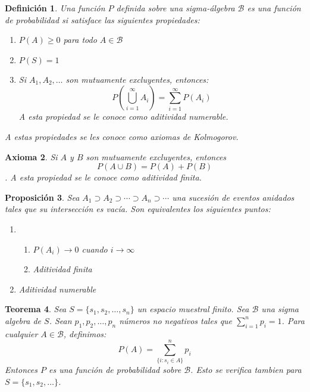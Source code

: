 \documentclass[14pt]{extarticle}
\newtheorem{theorem}{Teorema}[section]
\newtheorem{proposition}[theorem]{Proposición}
\newtheorem{definition}[theorem]{Definición}
\newtheorem{axiom}[theorem]{Axioma}
\begin{document}
\begin{definition}
    Una función $P$ definida sobre una sigma-álgebra $\mathcal{B}$ es una función de probabilidad si satisface las siguientes propiedades:
    \begin{enumerate}
        \item $P(A) \geq 0$ para todo $A \in \mathcal{B}$
        \item $P(S) = 1$
        \item Si $A_1, A_2, \ldots$ son mutuamente excluyentes, entonces:
        \[
            P(\bigcup_{i=1}^\infty A_i) = \sum_{i=1}^\infty P(A_i)
        \] 
        A esta propiedad se le conoce como aditividad numerable.
    \end{enumerate}
    A estas propiedades se les conoce como axiomas de Kolmogorov.
\end{definition}

\begin{axiom}
    Si $A$ y $B$ son mutuamente excluyentes, entonces $$P(A \cup B) = P(A) + P(B)$$.
    A esta propiedad se le conoce como aditividad finita.
\end{axiom}

\begin{proposition}
    Sea $A_1 \supset A_2 \supset \cdots \supset A_n \supset \cdots$ una sucesión de eventos anidados tales que su intersección es vacía.
    Son equivalentes los siguientes puntos:
    \begin{enumerate}
        \item
        \begin{enumerate}
            \item $P(A_i) \to 0$ cuando $i \to \infty$ 
            \item Aditividad finita
        \end{enumerate}
        \item Aditividad numerable
    \end{enumerate}
\end{proposition}

\begin{theorem}
    Sea  $S = \{s_1, s_2, \ldots, s_n\}$ un espacio muestral finito. Sea $\mathcal{B}$ una sigma algebra de $S$.
    Sean $p_1, p_2, \ldots, p_n$ números no negativos tales que $\sum_{i=1}^n p_i = 1$. Para cualquier $A \in \mathcal{B}$,
    definimos:
    \[
        P(A) = \sum_{\{ i: s_i \in A \}}^n p_i
    \]
    Entonces $P$ es una función de probabilidad sobre $\mathcal{B}$. Esto se verifica tambien para $S = \{s_1, s_2, \ldots\}$.
\end{theorem}
\end{document}
